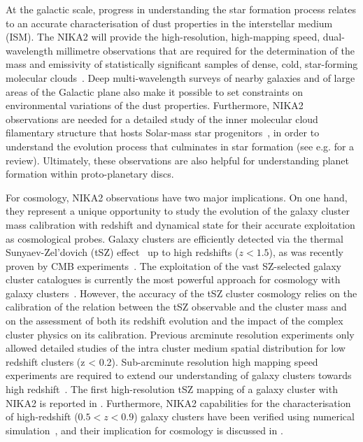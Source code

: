 \documentclass[traditionalabstract]{aa}
\newcommand{\lp}[1]{#1}
\begin{document}
At the galactic scale, progress in understanding the star formation
process relates to an accurate characterisation of dust properties in
the interstellar medium (ISM). The NIKA2 will provide the high-resolution,
high-mapping speed, dual-wavelength millimetre observations that are
required for the determination of the mass and emissivity of
statistically significant samples of dense, cold, star-forming
molecular clouds~\citep{Rigby2018}.
Deep multi-wavelength surveys of nearby galaxies and of large areas
of the Galactic plane also make it possible to set constraints on
environmental variations of the dust properties.
Furthermore, NIKA2 observations are needed for a
detailed study of the inner molecular cloud filamentary structure that
hosts Solar-mass star progenitors~\citep{Bracco2017}, in order to
understand the evolution process that culminates in star
formation (see e.g. \citet{Andre2014} for a review). Ultimately, these
observations are also helpful for understanding planet formation within
proto-planetary discs.

For cosmology, NIKA2 observations have two major
implications. On one hand, they represent a unique opportunity to
study the evolution of the galaxy cluster mass calibration with
redshift and {\lp dynamical state} for their accurate exploitation as cosmological probes. 
Galaxy clusters are efficiently detected via the thermal
Sunyaev-Zel'dovich (tSZ) effect~\citep{SZ1970} up to high redshifts {\lp ($z<1.5$)}, as was recently
proven by CMB
experiments~\citep{Hasselfield2013_ACT_SZ, Reichardt2013_SPT_SZ, Planck2016_SZcat}.
The exploitation of the vast SZ-selected galaxy cluster catalogues is
currently the most powerful approach for cosmology with galaxy
clusters~\citep{Planck_2016_SZ_cosmo}. However, the accuracy of the tSZ cluster
cosmology relies on the calibration of the relation between the tSZ
observable and the cluster mass and on the assessment of both its redshift
evolution and the impact of the complex cluster physics on its calibration. 
Previous arcminute resolution experiments only allowed detailed studies
of the intra cluster medium spatial distribution for low redshift clusters (z <
0.2). Sub-arcminute resolution high mapping speed experiments are
required to extend our understanding of galaxy clusters towards high
redshift~\citep{Tony2019}. The first high-resolution
tSZ mapping of a galaxy cluster with NIKA2 is reported
in \citet{Ruppin2018}. Furthermore, NIKA2 capabilities for the
characterisation of high-redshift {\lp ($0.5<z<0.9$)} galaxy clusters
have been verified using numerical simulation~\citep{Ruppin2019}, and
their implication for cosmology is discussed
in \citet{Ruppin2019b}.
\end{document}
